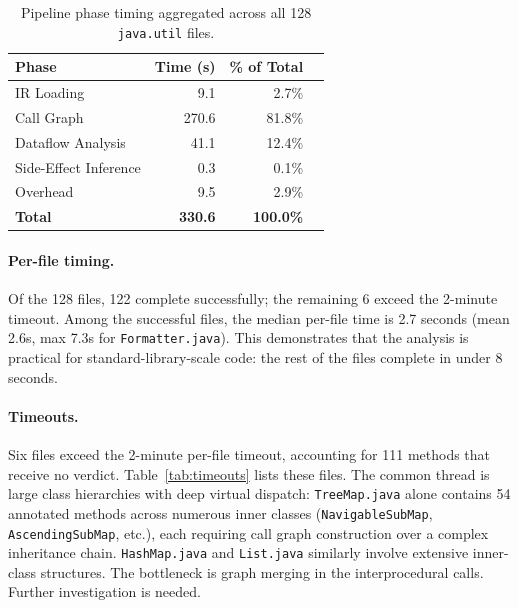 \begin{table}[h]
\centering
\caption{Pipeline phase timing aggregated across all 128 \texttt{java.util} files.}
\label{tab:pipeline}
\begin{tabular}{lrrr}
\toprule
\textbf{Phase} & \textbf{Time (s)} & \textbf{\% of Total} \\
\midrule
IR Loading          &    9.1 &  2.7\% \\
Call Graph          &  270.6 & 81.8\% \\
Dataflow Analysis   &   41.1 & 12.4\% \\
Side-Effect Inference   &    0.3 &  0.1\% \\
Overhead            &    9.5 &  2.9\% \\
\midrule
\textbf{Total}      & \textbf{330.6} & \textbf{100.0\%} \\
\bottomrule
\end{tabular}
\end{table}

\paragraph{Per-file timing.}
Of the 128 files, 122 complete successfully; the remaining 6 exceed the 2-minute timeout.
Among the successful files, the median per-file time is 2.7 seconds (mean 2.6s, max 7.3s for \texttt{Formatter.java}).
This demonstrates that the analysis is practical for standard-library-scale code: the rest of the files complete in under 8 seconds.

\paragraph{Timeouts.}
Six files exceed the 2-minute per-file timeout, accounting for 111 methods that receive no verdict.
Table~\ref{tab:timeouts} lists these files.
The common thread is large class hierarchies with deep virtual dispatch: \texttt{TreeMap.java} alone contains 54 annotated methods across numerous inner classes (\texttt{NavigableSubMap}, \texttt{AscendingSubMap}, etc.), each requiring call graph construction over a complex inheritance chain.
\texttt{HashMap.java} and \texttt{List.java} similarly involve extensive inner-class structures.
The bottleneck is graph merging in the interprocedural calls. Further investigation is needed. 

